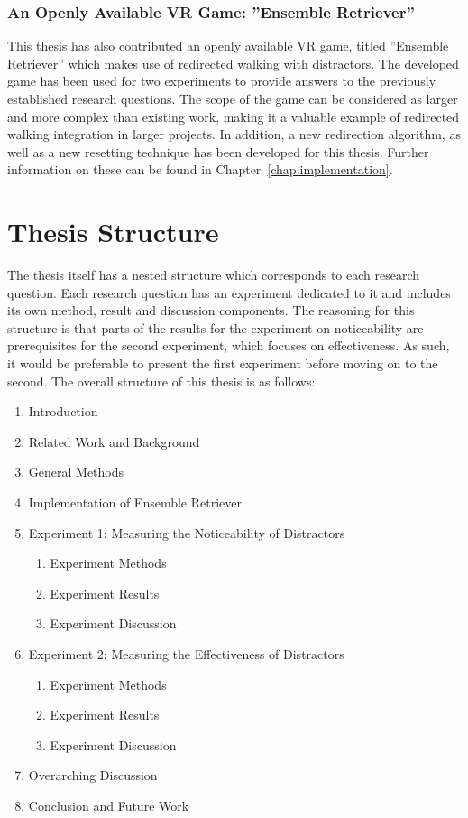 \subsubsection{An Openly Available VR Game: ''Ensemble Retriever''}
This thesis has also contributed an openly available VR game, titled ''Ensemble Retriever'' which makes use of redirected walking with distractors. The developed game has been used for two experiments to provide answers to the previously established research questions. The scope of the game can be considered as larger and more complex than existing work, making it a valuable example of redirected walking integration in larger projects. In addition, a new redirection algorithm, as well as a new resetting technique has been developed for this thesis. Further information on these can be found in Chapter~\ref{chap:implementation}. 

\section{Thesis Structure}
The thesis itself has a nested structure which corresponds to each research question. Each research question has an experiment dedicated to it and includes its own method, result and discussion components. The reasoning for this structure is that parts of the results for the experiment on noticeability are prerequisites for the second experiment, which focuses on effectiveness. As such, it would be preferable to present the first experiment before moving on to the second. The overall structure of this thesis is as follows:

\begin{enumerate}
    \item Introduction
    \item Related Work and Background
    \item General Methods
    \item Implementation of Ensemble Retriever
    \item Experiment 1: Measuring the Noticeability of Distractors
    \begin{enumerate}
        \item Experiment Methods
        \item Experiment Results
        \item Experiment Discussion
    \end{enumerate}
    \item Experiment 2: Measuring the Effectiveness of Distractors
    \begin{enumerate}
        \item Experiment Methods
        \item Experiment Results
        \item Experiment Discussion
    \end{enumerate}
    \item Overarching Discussion
    \item Conclusion and Future Work
\end{enumerate}